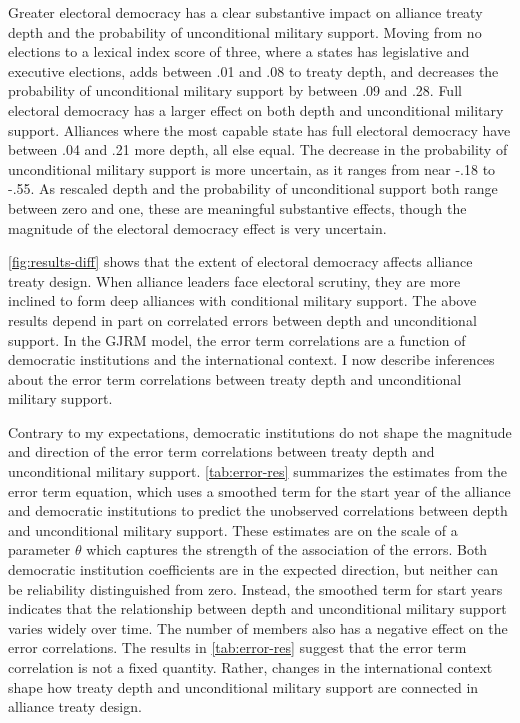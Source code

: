 \documentclass[12pt]{article}
\begin{document}
Greater electoral democracy has a clear substantive impact on alliance treaty depth and the probability of unconditional military support. 
Moving from no elections to a lexical index score of three, where a states has legislative and executive elections, adds between .01 and .08 to treaty depth, and decreases the probability of unconditional military support by between .09 and .28.
Full electoral democracy has a larger effect on both depth and unconditional military support. 
Alliances where the most capable state has full electoral democracy have between .04 and .21 more depth, all else equal. 
The decrease in the probability of unconditional military support is more uncertain, as it ranges from near -.18 to -.55. 
As rescaled depth and the probability of unconditional support both range between zero and one, these are meaningful substantive effects, though the magnitude of the electoral democracy effect is very uncertain. 


\autoref{fig:results-diff} shows that the extent of electoral democracy affects alliance treaty design.
When alliance leaders face electoral scrutiny, they are more inclined to form deep alliances with conditional military support. 
The above results depend in part on correlated errors between depth and unconditional support. 
In the GJRM model, the error term correlations are a function of democratic institutions and the international context. 
I now describe inferences about the error term correlations between treaty depth and unconditional military support. 


Contrary to my expectations, democratic institutions do not shape the magnitude and direction of the error term correlations between treaty depth and unconditional military support.
\autoref{tab:error-res} summarizes the estimates from the error term equation, which uses a smoothed term for the start year of the alliance and democratic institutions to predict the unobserved correlations between depth and unconditional military support. 
These estimates are on the scale of a parameter $\theta$ which captures the strength of the association of the errors. 
Both democratic institution coefficients are in the expected direction, but neither can be reliability distinguished from zero. 
Instead, the smoothed term for start years indicates that the relationship between depth and unconditional military support varies widely over time. 
The number of members also has a negative effect on the error correlations. 
The results in \autoref{tab:error-res} suggest that the error term correlation is not a fixed quantity. 
Rather, changes in the international context shape how treaty depth and unconditional military support are connected in alliance treaty design.
\end{document}
